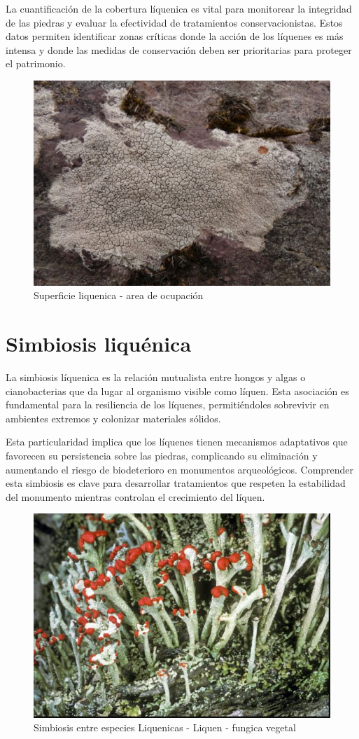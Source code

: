 La cuantificación de la cobertura líquenica es vital para monitorear la integridad de las piedras y evaluar la efectividad de tratamientos conservacionistas. Estos datos permiten identificar zonas críticas donde la acción de los líquenes es más intensa y donde las medidas de conservación deben ser prioritarias para proteger el patrimonio. \cite{Gamboa2017}

\begin{figure}[h]
	\centering
	\includegraphics[width=0.5\linewidth]{media/superficie-liquenica}
	\caption{Superficie liquenica - area de ocupación}
	\label{fig:superficie-liquenica}
\end{figure}


\section{Simbiosis liquénica}

La simbiosis líquenica es la relación mutualista entre hongos y algas o cianobacterias que da lugar al organismo visible como líquen. Esta asociación es fundamental para la resiliencia de los líquenes, permitiéndoles sobrevivir en ambientes extremos y colonizar materiales sólidos.

Esta particularidad implica que los líquenes tienen mecanismos adaptativos que favorecen su persistencia sobre las piedras, complicando su eliminación y aumentando el riesgo de biodeterioro en monumentos arqueológicos. Comprender esta simbiosis es clave para desarrollar tratamientos que respeten la estabilidad del monumento mientras controlan el crecimiento del líquen.

\begin{figure}[h]
	\centering
	\includegraphics[width=0.5\linewidth]{media/simbiosis-liquenica}
	\caption{Simbiosis entre especies Liquenicas - Liquen - fungica vegetal}
	\label{fig:simbiosis-liquenica}
\end{figure}


